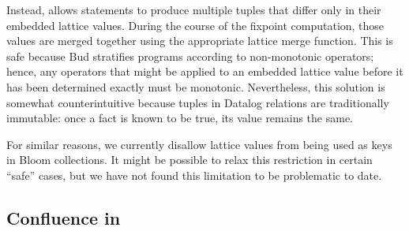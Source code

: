 Instead, \lang allows statements to produce multiple tuples that differ only in
their embedded lattice values. During the course of the fixpoint computation,
those values are merged together using the appropriate lattice merge
function. This is safe because Bud stratifies programs according to
non-monotonic operators; hence, any operators that might be applied to an
embedded lattice value before it has been determined exactly must be
monotonic. Nevertheless, this solution is somewhat counterintuitive because
tuples in Datalog relations are traditionally immutable: once a fact is known to
be true, its value remains the same.


For similar reasons, we currently disallow lattice values from being used as
keys in Bloom collections. It might be possible to relax this restriction in
certain ``safe'' cases, but we have not found this limitation to be problematic
to date.

\subsection{Confluence in \lang}
